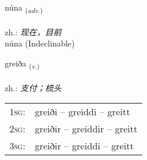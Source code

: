 \documentclass[frontgrid, backgrid]{flacards}\usepackage[]{graphicx}\usepackage[]{xcolor}
\begin{document}

\renewcommand{\flhead}{\vskip5pt \fboxsep=0pt {\small\bfseries\footnotesize Atviksorð | 副词}}
\renewcommand{\fcfoot}{\vskip5pt \fboxsep=0pt \hspace{2pt}{\small\bfseries\footnotesize 1K}}

\renewcommand{\blhead}{\vskip5pt {\small\bfseries\footnotesize Atviksorð | 副词 }}
\renewcommand{\bcfoot}{\vskip5pt \hspace{2pt}{\small\bfseries\footnotesize 1K}}


{núna \small{\textsubscript{(\textit{adv.})}} \\[1ex]
\textphonetic{[nuːna]} \\
zh.: \emph{现在，目前} \\  [2ex]
núna (Indeclinable)}

\renewcommand{\flhead}{\vskip5pt \fboxsep=0pt {\small\bfseries\footnotesize Sagnorð | 动词}}
\renewcommand{\fcfoot}{\vskip5pt \fboxsep=0pt \hspace{2pt}{\small\bfseries\footnotesize 1K}}

\renewcommand{\blhead}{\vskip5pt {\small\bfseries\footnotesize Sagnorð | 动词 }}
\renewcommand{\bcfoot}{\vskip5pt \hspace{2pt}{\small\bfseries\footnotesize 1K}}


{greiða \small{\textsubscript{(\textit{v.})}} \\[1ex] %
\textphonetic{[kreiːða]} \\
zh.: \emph{支付；梳头} \\  [2ex]
\renewcommand*{\arraystretch}{0.8}
\begin{tabular}{p{1cm}l}
\textsc{1sg}: & greiði -- greiddi -- greitt \\ 
\textsc{2sg}: & greiðir -- greiddir -- greitt \\ 
\textsc{3sg}: & greiðir -- greiddi -- greitt \\ 
\end{tabular}
}

\renewcommand{\flhead}{\vskip5pt \fboxsep=0pt {\small\bfseries\footnotesize Atviksorð | 副词}}
\renewcommand{\fcfoot}{\vskip5pt \fboxsep=0pt \hspace{2pt}{\small\bfseries\footnotesize 1K}}
\end{document}
